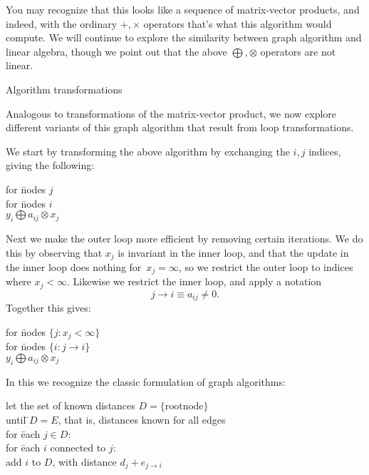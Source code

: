 You may recognize that this looks like a sequence of matrix-vector
products, and indeed, with the ordinary $+,\times$ operators
that's what this algorithm would compute.
We will continue to explore the similarity between graph algorithm
and linear algebra, though we point out that the above $\bigoplus,\otimes$
operators are not linear.

 {Algorithm transformations}

Analogous to transformations of the matrix-vector product,
we now explore different variants of this graph algorithm
that result from loop transformations.

We start by transforming the above algorithm by exchanging the $i,j$ indices,
giving the following:

\begin{tabbing}
for \=nodes $j$\\
\> for \=nodes $i$\\
\>\> $y_i \bigoplus a_{ij}\otimes x_j$
\end{tabbing}

Next we make the outer loop more efficient by removing
certain iterations.
We do this by observing that $x_j$ is invariant in the inner loop,
and that the update in the inner loop does nothing
for~$x_j=\infty$, so we restrict the outer loop to
indices where $x_j<\infty$.
Likewise we restrict the inner loop, and apply a notation
\[ j\rightarrow i \equiv a_{ij}\not=0. \]
Together this gives:

\begin{tabbing}
for \=nodes $\{j\colon x_j<\infty\}$\\
\> for \=nodes $\{i\colon j\rightarrow i\}$\\
\>\> $y_i \bigoplus a_{ij}\otimes x_j$\\
\end{tabbing}

In this we recognize the classic formulation of graph algorithms:

\begin{tabbing}
let the set of known distances $D=\{ \mathrm{root node} \}$\\
until \=$D=E$, that is, distances known for all edges\\
\>for \=each $j\in D$:\\
\>\>for \=each $i$ connected to $j$:\\
\>\>\>add $i$ to $D$, with distance $d_j+e_{j\rightarrow i}$\\
\end{tabbing}

